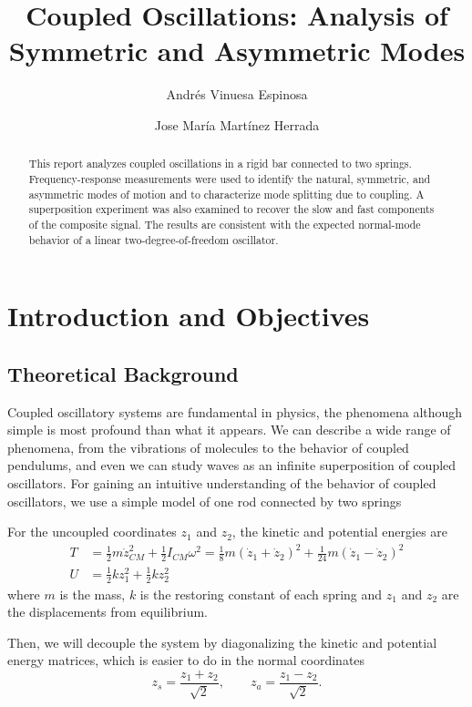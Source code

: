 \documentclass[a4paper,11pt]{article}
\begin{document}
\title{Coupled Oscillations: Analysis of Symmetric and Asymmetric Modes}
\author{Andrés Vinuesa Espinosa \and Jose María Martínez Herrada}
\maketitle

\begin{abstract}
This report analyzes coupled oscillations in a rigid bar connected to two springs. Frequency-response measurements were used to identify the natural, symmetric, and asymmetric modes of motion and to characterize mode splitting due to coupling. A superposition experiment was also examined to recover the slow and fast components of the composite signal. The results are consistent with the expected normal-mode behavior of a linear two-degree-of-freedom oscillator.
\end{abstract}

\section{Introduction and Objectives}

\subsection{Theoretical Background}
Coupled oscillatory systems are fundamental in physics, the phenomena although simple is most profound than what it appears.
We can describe a wide range of phenomena, from the vibrations of molecules to the behavior of coupled pendulums, and even we can study waves as an infinite superposition of coupled oscillators.
For gaining an intuitive understanding of the behavior of coupled oscillators, we use a simple model of one rod connected by two springs


For the uncoupled coordinates $z_1$ and $z_2$, the kinetic and potential energies are
\begin{align}
    T &= \frac{1}{2}m\dot{z}_{CM}^2 + \frac{1}{2}I_{CM}\omega^2 = \frac{1}{8}m(\dot{z}_1 + \dot{z}_2)^2 + \frac{1}{24}m(\dot{z}_1 - \dot{z}_2)^2 \\
    U &= \frac{1}{2}kz_1^2 + \frac{1}{2}kz_2^2
\end{align}
where $m$ is the mass, $k$ is the restoring constant of each spring  and $z_1$ and $z_2$ are the displacements from equilibrium.

Then, we will decouple the system by diagonalizing the kinetic and potential energy matrices, which is easier to do in the normal coordinates
\begin{equation}
z_s = \frac{z_1 + z_2}{\sqrt{2}}, \qquad z_a = \frac{z_1 - z_2}{\sqrt{2}}.
\end{equation}
\end{document}
